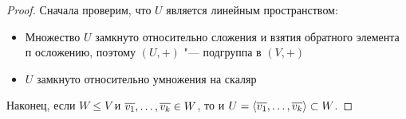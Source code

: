     \begin{proof}
    	Сначала проверим, что $U$ является линейным пространством:
    	\begin{itemize}
    		\item Множество $U$ замкнуто относительно сложения и взятия обратного элемента п осложению, поэтому $(U, +)$ "--- подгруппа в $(V, +)$
    		
    		\item $U$ замкнуто относительно умножения на скаляр
    	\end{itemize}
    
    	Наконец, если $W \le V$ и $\overline{v_1}, \dots, \overline{v_k} \hm{\in} W$, то и $U = \langle\overline{v_1}, \dots, \overline{v_k}\rangle \hm{\subset} W$.
    \end{proof}
    